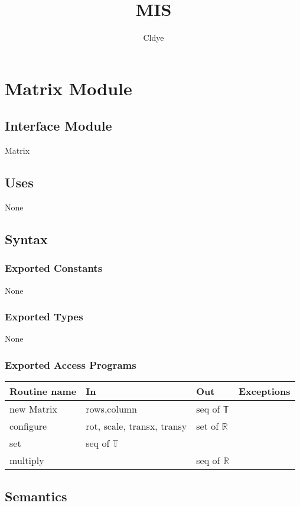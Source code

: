 \documentclass[12pt]{article}
\title{MIS}
\author{Cldye}
\begin{document}
\newpage

\section* {Matrix Module}

\subsection*{Interface Module}

Matrix

\subsection* {Uses}

None

\subsection* {Syntax}

\subsubsection* {Exported Constants}

None

\subsubsection* {Exported Types}

None 

\subsubsection* {Exported Access Programs}

\begin{tabular}{| l | l | l | p{5cm} |}
\hline
\textbf{Routine name} & \textbf{In} & \textbf{Out} & \textbf{Exceptions}\\
\hline
new Matrix & rows,column  & seq of $\mathbb{T}$ & ~\\
\hline
configure & rot, scale, transx, transy & set of $\mathbb{R}$ & ~\\
\hline
set & seq of $\mathbb{T}$ & ~ & ~\\
\hline
multiply & ~ & seq of $\mathbb{R}$ & ~\\
\hline

\end{tabular}
\subsection* {Semantics}
\end{document}
